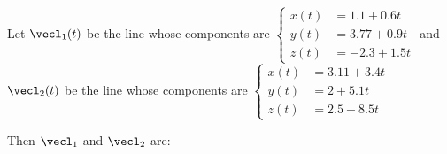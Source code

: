 \documentclass{ximera}
\author{Gregory Hartman \and Matthew Carr}
\begin{document}
\begin{exercise}
Let $\vecl_{1}(t)$ be the line whose components are $\left\{ \begin{aligned}x(t) & =1.1+0.6t\\
y(t) & =3.77+0.9t\\
z(t) & =-2.3+1.5t
\end{aligned}
\right.$  and $\vecl_{2}(t)$ be the line whose components are $\left\{ \begin{aligned}x(t) & =3.11+3.4t\\
y(t) & =2+5.1t\\
z(t) & =2.5+8.5t
\end{aligned}
\right.$

Then $\vecl_{1}$ and $\vecl_{2}$ are: 

\begin{multipleChoice}
\end{multipleChoice}


\end{exercise}
\end{document}
